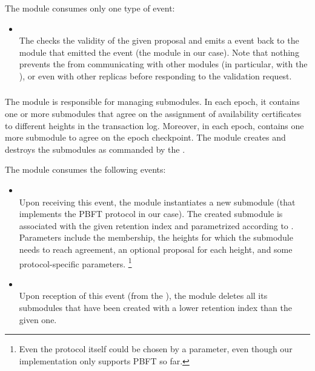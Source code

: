 \documentclass{article}
\begin{document}
The  module consumes only one type of event:

\begin{itemize}
    
    \item {}\\
    The  checks the validity of the given proposal and emits a  event
    back to the module that emitted the  event (the  module in our case).
    Note that nothing prevents the  from communicating with other modules
    (in particular, with the ), or even with other replicas before responding to the validation request.
    
\end{itemize}

\subsubsection{}
\label{sec:module-ordering}

The  module is responsible for managing  submodules.
In each epoch, it contains one or more submodules that agree on the assignment of availability certificates
to different heights in the transaction log.
Moreover, in each epoch,  contains one more submodule to agree on the epoch checkpoint.
The  module creates and destroys the submodules as commanded by the .

The  module consumes the following events:

\begin{itemize}

    \item {}\\
    Upon receiving this event, the  module instantiates a new  submodule
    (that implements the PBFT protocol in our case).
    The created submodule is associated with the given retention index and parametrized according to .
    Parameters include the membership, the heights for which the submodule needs to reach agreement,
    an optional proposal for each height, and some protocol-specific parameters.%
    \footnote{Even the protocol itself could be chosen by a parameter, even though our implementation only supports PBFT so far.}

    \item {}\\
    Upon reception of this event (from the ),
    the  module deletes all its submodules that have been created with a lower retention index than the given one.

\end{itemize}
\end{document}

